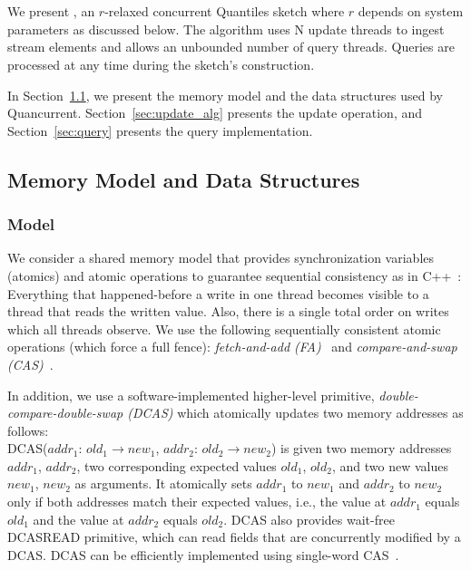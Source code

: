 \chapter{\mysketch}
\label{chap:quancurrent}

We present \mysketch, an $r$-relaxed concurrent Quantiles sketch where $r$ depends on system parameters as discussed below. The algorithm uses \gls{N} update threads to ingest stream elements and allows an unbounded number of query threads. Queries are processed at any time during the sketch's construction. 

In Section~\ref{sec:model_data_org}, we present the memory model and the data structures used by Quancurrent. Section~\ref{sec:update_alg} presents the update operation, and Section~\ref{sec:query} presents the query implementation. 

\section{Memory Model and Data Structures} \label{sec:model_data_org}
\subsection{Model}

We consider a shared memory model that provides synchronization variables (atomics) and atomic operations to guarantee sequential consistency as in C++~\cite{Boehm_2008_cpp}: Everything that happened-before a write in one thread becomes visible to a thread that reads the written value. Also, there is a single total order on writes which all threads observe. 
We use the following sequentially consistent atomic operations (which force a full fence): \emph{fetch-and-add (\acrshort{FA})}~\cite{x86-faa} and \emph{compare-and-swap (\acrshort{CAS})}~\cite{x86-cas}. 

In addition, we use a software-implemented higher-level primitive, \emph{double-compare-double-swap (\acrshort{DCAS})} which atomically updates two memory addresses as follows:\\
DCAS($addr_1$: $old_1 \to new_1$, $addr_2$: $old_2 \to new_2$)
is given two memory addresses $addr_1$, $addr_2$, two corresponding expected values $old_1$, $old_2$, and two new values $new_1$, $new_2$ as arguments. It atomically sets $addr_1$ to $new_1$ and $addr_2$ to $new_2$ only if both addresses match their expected values, i.e., the value at $addr_1$ equals $old_1$ and the value at $addr_2$ equals $old_2$. DCAS also provides wait-free \acrshort{DCASREAD} primitive, which can read fields that are concurrently modified by a DCAS. DCAS can be efficiently implemented using single-word CAS~\cite{Harris2002practical,guerraoui2020efficient}. 

